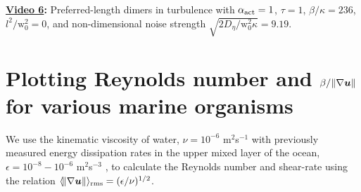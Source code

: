 \documentclass[../Rajarshi-thesis-draft.tex]{subfiles}
\begin{document}
\textbf{\href{https://office365stanford-my.sharepoint.com/:v:/g/personal/rchajwa_stanford_edu/ESqNMTQ2hSlPrDQBZeIoUU4BEBzXHlOKGJ5iombDW8EURQ?nav=eyJyZWZlcnJhbEluZm8iOnsicmVmZXJyYWxBcHAiOiJPbmVEcml2ZUZvckJ1c2luZXNzIiwicmVmZXJyYWxBcHBQbGF0Zm9ybSI6IldlYiIsInJlZmVycmFsTW9kZSI6InZpZXciLCJyZWZlcnJhbFZpZXciOiJNeUZpbGVzTGlua0NvcHkifX0&e=ZQwgGN}{Video 6}:} Preferred-length dimers in turbulence with $\alpha_{\rm act} = 1$, $\tau = 1$, $\beta/\kappa = 236$, $l^{2}/\mathrm{w}_{0}^{2} = 0$,  and non-dimensional noise strength $\sqrt{2D_\eta/\mathrm{w}_{0}^2\kappa} = 9.19$.

\section{Plotting Reynolds number and \texorpdfstring{$\beta/\norm{\nabla \boldsymbol{u}}$}{Lg} for various marine organisms}
\label{act-plankton}
We use the kinematic viscosity of water, $\nu = 10^{-6}$ m$^{2}$s$^{-1}$ with previously measured energy dissipation rates in the upper mixed layer of the ocean, $\epsilon = 10^{-8} - 10^{-6}$ m$^{2}$s$^{-3}$ \cite{StockerARFM2012}, to calculate the Reynolds number and shear-rate using the relation $\langle \norm{\nabla \boldsymbol{u}}\rangle_{\rm rms} = (\epsilon/\nu)^{1/2}$.
\end{document}
